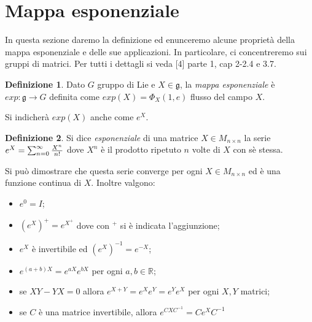 \documentclass[12pt,a4paper]{report}
\theoremstyle{definition}
\newtheorem{Def}{Definizione}[chapter]
\theoremstyle{Theorem}
\newtheorem{Prop}[Def]{Proposizione}
\theoremstyle{definition}
\theoremstyle{definition}
\theoremstyle{definition}
\begin{document}
\section{Mappa esponenziale}
In questa sezione daremo la definizione ed enunceremo alcune proprietà della mappa esponenziale e delle sue applicazioni. In particolare, ci concentreremo sui gruppi di matrici. Per tutti i dettagli si veda [4] parte 1, cap 2-2.4 e 3.7.
\begin{Def}
	Dato $G$ gruppo di Lie e $X\in\mathfrak{g}$, la \textit{mappa esponenziale} è \\$exp:\mathfrak{g}\rightarrow G$ definita come $exp(X)=\Phi_X(1,e)$ flusso del campo $X$.
\end{Def}
Si indicherà $exp(X)$ anche come $e^X$.
\begin{comment}
La mappa esponenziale verifica numerose proprietà, in particolare per i gruppi di Lie di matrici.
\begin{Prop}
Sia un gruppo di Lie di matrici, allora valgono le seguenti proprietà per la mappa esponenziale:\begin{itemize}
\item $exp(tX)=\Phi_X(t,e)$ per ogni $X\in \mathfrak{g}$ e $t\in \mathbb{R}$;
\item $exp((t+s)X)=exp(tX)\circ exp(sX)$ per ogni $X\in \mathfrak{g}$ e $s,t\in\mathbb{R}$;
\item $exp$ è analitica ed è un diffeomorfismo di un intorno di $0\in\mathfrak{g}$ in un intorno di $e\in G$;
\item ${d\over dt}\bigg{\rvert}_0exp(tX)=X$. 
\end{itemize}
\end{Prop}
Per le dimostrazioni si faccia riferimento a [2] (pag. 85, 86 cap. 2) e [3] (pag. 23 cap. 1).\\
\\
Prima di enunciare altre proprietà, è necessario definire l'esponenziale di matrice.%
\end{comment}
\begin{Def}
	Si dice \textit{esponenziale} di una matrice $X\in M_{n\times n}$ la serie \\$e^X=\sum_{n=0}^{\infty}{X^n\over n! }$ dove $X^n$ è il prodotto ripetuto $n$ volte di $X$ con sè stessa.
\end{Def}
Si può dimostrare che questa serie converge per ogni $X\in M_{n\times n}$ ed è una funzione continua di $X$. Inoltre valgono:\begin{itemize}
	\item $e^0=I$;
	\item $(e^X)^+=e^{X^+}$ dove con $^+$ si è indicata l'aggiunzione;
	\item $e^X$ è invertibile ed $(e^X)^{-1}=e^{-X}$;
	\item $e^{(a+b)X}=e^{aX}e^{bX}$ per ogni $a,b\in\mathbb{R}$;
	\item se $XY-YX=0$ allora $e^{X+Y}=e^Xe^Y=e^Ye^X$ per ogni $X,Y$ matrici;\\
	\item se $C$ è una matrice invertibile, allora $e^{CXC^{-1}}=Ce^XC^{-1}$
\end{itemize} 
\end{document}
